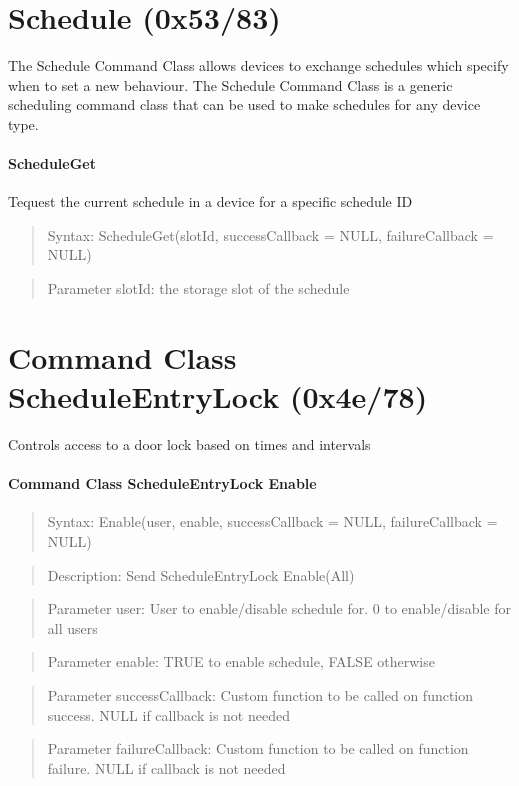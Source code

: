 \section{Schedule (0x53/83)}		

The Schedule Command Class allows devices to exchange schedules which specify when to set 
a new behaviour. The Schedule Command Class is a generic scheduling command class that 
can be used to make schedules for any device type.


\paragraph {ScheduleGet}
Tequest the current schedule in a device for a specific schedule ID 	
\begin{quote} Syntax: ScheduleGet(slotId, successCallback = NULL, failureCallback = NULL)\end{quote}
\begin{quote} Parameter slotId: the storage slot of the schedule\end{quote}
 


\section{Command Class ScheduleEntryLock (0x4e/78)}

Controls access to a door lock based on  times and intervals

\paragraph {Command Class ScheduleEntryLock Enable}
\begin{quote} Syntax: Enable(user, enable, successCallback = NULL, failureCallback = NULL)\end{quote}
\begin{quote} Description: Send ScheduleEntryLock Enable(All)\end{quote}
\begin{quote} Parameter user: User to enable/disable schedule for. 0 to enable/disable for all users\end{quote}
\begin{quote} Parameter enable: TRUE to enable schedule, FALSE otherwise\end{quote}
\begin{quote} Parameter successCallback: Custom function to be called on function success. NULL if callback is not needed\end{quote}
\begin{quote} Parameter failureCallback: Custom function to be called on function failure. NULL if callback is not needed\end{quote}

